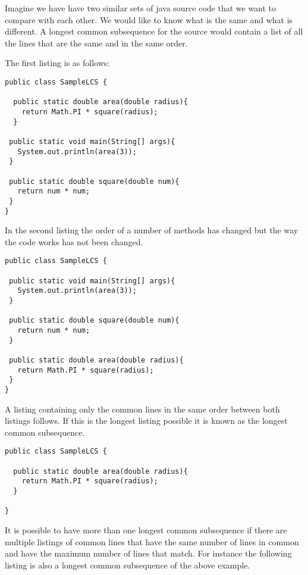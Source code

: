 Imagine we have have two similar sets of java source code that we want to compare with each other.  
We would like to know what is the same and what is different.
A longest common subsequence for the source would contain a list of all the lines that are the same and in the same order.

The first listing is as follows:

\begin{lstlisting}
public class SampleLCS { 

  public static double area(double radius){
    return Math.PI * square(radius);
  }
  
 public static void main(String[] args){
   System.out.println(area(3));
 }
 
 public static double square(double num){
   return num * num;
 }
}

\end{lstlisting}

In the second listing the order of a number of methods has changed but the way the code works has not been changed.

\begin{lstlisting}
public class SampleLCS {

 public static void main(String[] args){
   System.out.println(area(3));
 }
 
 public static double square(double num){
   return num * num;
 }
 
 public static double area(double radius){
   return Math.PI * square(radius);
 }
}

\end{lstlisting}

A listing containing only the common lines in the same order between both listings follows.  If this is the longest listing possible it is known as the longest common subsequence.  

\begin{lstlisting}
public class SampleLCS { 

  public static double area(double radius){
    return Math.PI * square(radius);
  }
  
}

\end{lstlisting}

It is possible to have more than one longest common subsequence if there are multiple listings of common lines that have the same number of lines in common and have the maximum number of lines that match.  For instance the following listing is also a longest common subsequence of the above example.

